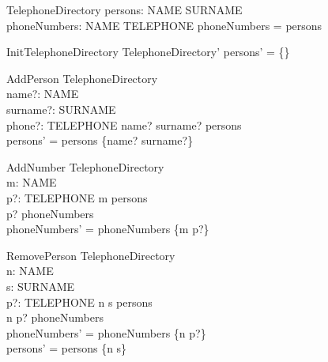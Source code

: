 \documentclass{article}
\begin{document}
\begin{zed}
[NAME] 
\end{zed}

\begin{zed}
[SURNAME]
\end{zed}

\begin{zed}
[TELEPHONE]
\end{zed}


\begin{schema}{TelephoneDirectory}
persons: NAME \fun SURNAME \\ 
phoneNumbers: NAME \pfun TELEPHONE
\where 
\dom phoneNumbers = \dom persons
\end{schema}

\begin{schema}{InitTelephoneDirectory} 
TelephoneDirectory'
\where 
persons' = \{\}
\end{schema}

\begin{schema}{AddPerson}
\Delta TelephoneDirectory \\
name?: NAME \\
surname?: SURNAME \\
phone?: TELEPHONE
\where
name? \mapsto surname? \notin persons\\
persons' = persons \cup \{name? \mapsto surname?\}
\end{schema}

\begin{schema}{AddNumber}
\Delta TelephoneDirectory \\
m: NAME \\
p?: TELEPHONE
\where
m \notin \dom persons \\
p? \notin \ran phoneNumbers \\
phoneNumbers' = phoneNumbers \cup \{m \mapsto p?\}
\end{schema}

\begin{schema}{RemovePerson}
\Delta TelephoneDirectory \\
n: NAME \\
s: SURNAME \\
p?: TELEPHONE
\where
n \mapsto s \in persons\\
n \mapsto p? \in phoneNumbers\\
phoneNumbers' = phoneNumbers \setminus \{n \mapsto p?\} \\
persons' = persons \setminus \{n \mapsto s\}
\end{schema}
\end{document}
